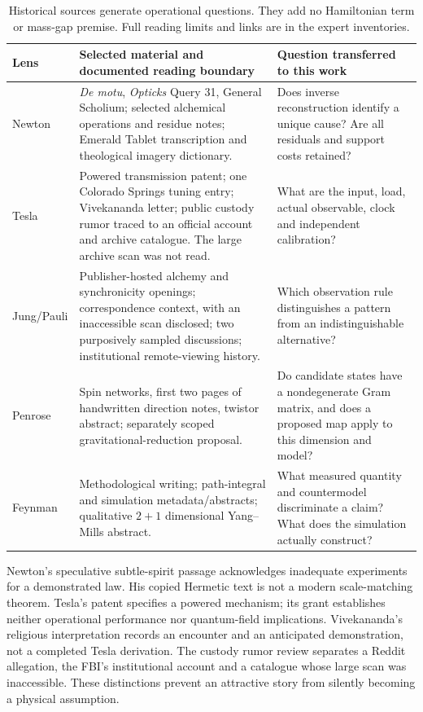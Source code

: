 \documentclass[11pt,a4paper]{article}
\begin{document}
\begin{table}[ht]
\centering\small
\begin{tabularx}{\textwidth}{@{}p{19mm}Xp{43mm}@{}}
\toprule Lens & Selected material and documented reading boundary & Question transferred to this work \\
\midrule
Newton & \emph{De motu}, \emph{Opticks} Query 31, General Scholium; selected alchemical operations and residue notes; Emerald Tablet transcription and theological imagery dictionary. & Does inverse reconstruction identify a unique cause? Are all residuals and support costs retained? \\
Tesla & Powered transmission patent; one Colorado Springs tuning entry; Vivekananda letter; public custody rumor traced to an official account and archive catalogue. The large archive scan was not read. & What are the input, load, actual observable, clock and independent calibration? \\
Jung/Pauli & Publisher-hosted alchemy and synchronicity openings; correspondence context, with an inaccessible scan disclosed; two purposively sampled discussions; institutional remote-viewing history. & Which observation rule distinguishes a pattern from an indistinguishable alternative? \\
Penrose & Spin networks, first two pages of handwritten direction notes, twistor abstract; separately scoped gravitational-reduction proposal. & Do candidate states have a nondegenerate Gram matrix, and does a proposed map apply to this dimension and model? \\
Feynman & Methodological writing; path-integral and simulation metadata/abstracts; qualitative $2+1$ dimensional Yang--Mills abstract. & What measured quantity and countermodel discriminate a claim? What does the simulation actually construct? \\
\bottomrule
\end{tabularx}
\caption{Historical sources generate operational questions. They add no Hamiltonian term or mass-gap premise. Full reading limits and links are in the expert inventories.}
\end{table}

Newton's speculative subtle-spirit passage acknowledges inadequate experiments for a demonstrated law. His copied Hermetic text is not a modern scale-matching theorem. Tesla's patent specifies a powered mechanism; its grant establishes neither operational performance nor quantum-field implications. Vivekananda's religious interpretation records an encounter and an anticipated demonstration, not a completed Tesla derivation. The custody rumor review separates a Reddit allegation, the FBI's institutional account and a catalogue whose large scan was inaccessible. These distinctions prevent an attractive story from silently becoming a physical assumption.
\end{document}
